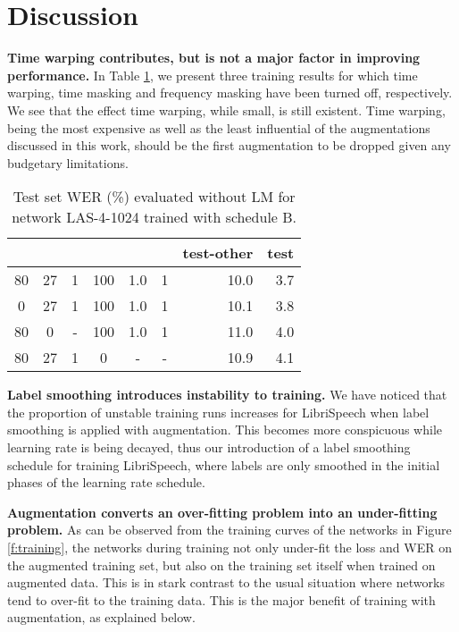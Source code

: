 \documentclass[a4paper]{article}
\begin{document}
\section{Discussion}\label{s:discussion}

\noindent\textbf{Time warping contributes, but is not a major factor in improving performance.} In Table \ref{tab:abalation}, we present three training results for which time warping, time masking and frequency masking have been turned off, respectively. We see that the effect time warping, while small, is still existent. Time warping, being the most expensive as well as the least influential of the augmentations discussed in this work, should be the first augmentation to be dropped given any budgetary limitations.
\smallskip

\begin{table}[th]
  \vskip -0.1in
  \caption{Test set WER (\%) evaluated without LM for network LAS-4-1024 trained with schedule B.}
  \label{tab:abalation}
  \centering
  \footnotesize
  \begin{tabular}{ccccccrr}
    \toprule
     &  &  &  &  &  & test-other & test \\
    \midrule
    80 & 27 & 1 & 100 & 1.0 & 1 & 10.0 & 3.7 \\
    \midrule
    0  & 27 & 1 & 100 & 1.0 & 1 & 10.1 & 3.8 \\
    80 &  0 & - & 100 & 1.0 & 1 & 11.0 & 4.0 \\
    80 & 27 & 1 & 0 & - & - & 10.9 & 4.1 \\
    \bottomrule
  \end{tabular}
  \vskip -0.1in
\end{table}

\noindent\textbf{Label smoothing introduces instability to training.} We have noticed that the proportion of unstable training runs increases for LibriSpeech when label smoothing is applied with augmentation. This becomes more conspicuous while learning rate is being decayed, thus our introduction of a label smoothing schedule for training LibriSpeech, where labels are only smoothed in the initial phases of the learning rate schedule.
\smallskip

\noindent\textbf{Augmentation converts an over-fitting problem into an under-fitting problem.} As can be observed from the training curves of the networks in Figure \ref{f:training}, the networks during training not only under-fit the loss and WER on the augmented training set, but also on the training set itself when trained on augmented data. This is in stark contrast to the usual situation where networks tend to over-fit to the training data. This is the major benefit of training with augmentation, as explained below.
\smallskip
\end{document}

